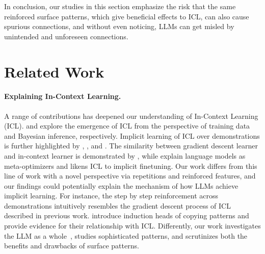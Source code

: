 \documentclass{article} %
\begin{document}
In conclusion, our studies in this section emphasize the risk that the same reinforced surface patterns, which give beneficial effects to ICL, can also cause spurious connections, and without even noticing, LLMs can get misled by unintended and unforeseen connections.

\section{Related Work}

\paragraph{Explaining In-Context Learning.}
A range of contributions has deepened our understanding of In-Context Learning (ICL). \cite{chan2022data} and \cite{xie2022an} explore the emergence of ICL from the perspective of training data and Bayesian inference, respectively. 
Implicit learning of ICL over demonstrations is further highlighted by \cite{garg2023transformers}, \cite{li2023transformers}, and \cite{hahn2023theory}. The similarity between gradient descent learner and in-context learner is demonstrated by \cite{gd1,vonoswald2023transformers}, while \cite{dai2023gpt} explain language models as meta-optimizers and likens ICL to implicit finetuning. 
Our work differs from this line of work with a novel perspective via repetitions and reinforced features, and our findings could potentially explain the mechanism of how LLMs achieve implicit learning. For instance, the step by step reinforcement across demonstrations intuitively resembles the gradient descent process of ICL described in previous work. 
\cite{olsson2022context} introduce induction heads of copying patterns and provide evidence for their relationship with ICL. Differently, our work investigates the LLM as a whole~\citep{anderson1972more}, studies sophisticated patterns, and scrutinizes both the benefits and drawbacks of surface patterns.
\end{document}
